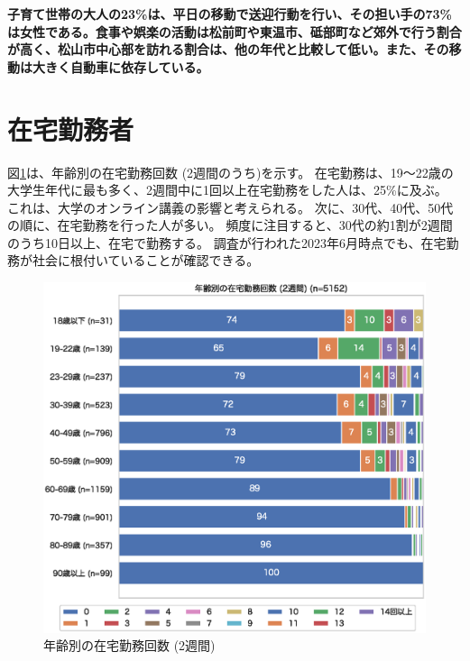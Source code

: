 \documentclass[a4paper,12pt, uplatex]{jsbook}
\begin{document}
\color{red}
\begin{framed}
\noindent
\textbf{\large 子育て世帯の大人の23\%は、平日の移動で送迎行動を行い、その担い手の73\%は女性である。食事や娯楽の活動は松前町や東温市、砥部町など郊外で行う割合が高く、松山市中心部を訪れる割合は、他の年代と比較して低い。また、その移動は大きく自動車に依存している。}
\end{framed}
\color{black}



\clearpage
\section{在宅勤務者}

図\ref{fig:online_work_age}は、年齢別の在宅勤務回数 (2週間のうち)を示す。
在宅勤務は、19〜22歳の大学生年代に最も多く、2週間中に1回以上在宅勤務をした人は、25\%に及ぶ。
これは、大学のオンライン講義の影響と考えられる。
次に、30代、40代、50代の順に、在宅勤務を行った人が多い。
頻度に注目すると、30代の約1割が2週間のうち10日以上、在宅で勤務する。
調査が行われた2023年6月時点でも、在宅勤務が社会に根付いていることが確認できる。
%
\begin{figure}[htbp]
    \centering
    \includegraphics[width=1.0\textwidth]{picture/online_work_age.eps}
    \caption{年齢別の在宅勤務回数 (2週間)}
    \label{fig:online_work_age}
\end{figure}
\end{document}
